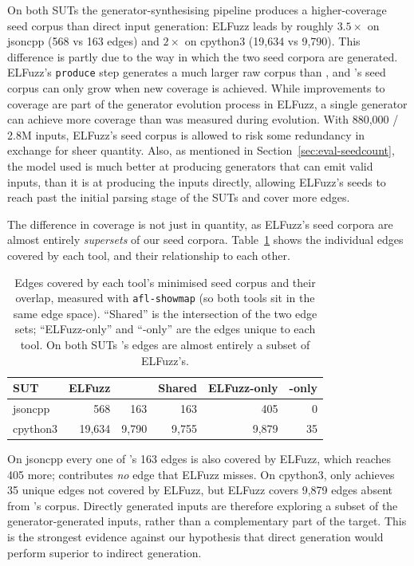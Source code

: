On both SUTs the generator-synthesising pipeline produces a higher-coverage seed corpus than direct input generation: ELFuzz leads by roughly $3.5\times$ on jsoncpp (568 vs 163 edges) and $2\times$ on cpython3 (19{,}634 vs 9{,}790). This difference is partly due to the way in which the two seed corpora are generated. ELFuzz's \texttt{produce} step generates a much larger raw corpus than \toolname{}, and \toolname{}'s seed corpus can only grow when new coverage is achieved. While improvements to coverage are part of the generator evolution process in ELFuzz, a single generator can achieve more coverage than was measured during evolution. With 880,000 / 2.8M inputs, ELFuzz's seed corpus is allowed to risk some redundancy in exchange for sheer quantity. Also, as mentioned in Section~\ref{sec:eval-seedcount}, the model used is much better at producing generators that can emit valid inputs, than it is at producing the inputs directly, allowing ELFuzz's seeds to reach past the initial parsing stage of the SUTs and cover more edges.

The difference in coverage is not just in quantity, as ELFuzz's seed corpora are almost entirely \textit{supersets} of our seed corpora. Table~\ref{tab:edgesets} shows the individual edges covered by each tool, and their relationship to each other.

\begin{table}[h]
    \centering
    \begin{tabular}{lrrrrr}
        \toprule
        \textbf{SUT} & \textbf{ELFuzz} & \textbf{\toolname{}} & \textbf{Shared} & \textbf{ELFuzz-only} & \textbf{\toolname{}-only} \\
        \midrule
        jsoncpp  & 568      & 163     & 163     & 405     & 0  \\
        cpython3 & 19{,}634 & 9{,}790 & 9{,}755 & 9{,}879 & 35 \\
        \bottomrule
    \end{tabular}
    \caption{Edges covered by each tool's minimised seed corpus and their overlap, measured with \texttt{afl-showmap} (so both tools sit in the same edge space). ``Shared'' is the intersection of the two edge sets; ``ELFuzz-only'' and ``\toolname{}-only'' are the edges unique to each tool. On both SUTs \toolname{}'s edges are almost entirely a subset of ELFuzz's.}
    \label{tab:edgesets}
\end{table}

On jsoncpp every one of \toolname{}'s 163 edges is also covered by ELFuzz, which reaches 405 more; \toolname{} contributes \textit{no} edge that ELFuzz misses. On cpython3, \toolname{} only achieves 35 unique edges not covered by ELFuzz, but ELFuzz covers 9{,}879 edges absent from \toolname{}'s corpus. Directly generated inputs are therefore exploring a subset of the generator-generated inputs, rather than a complementary part of the target. This is the strongest evidence against our hypothesis that direct generation would perform superior to indirect generation.

